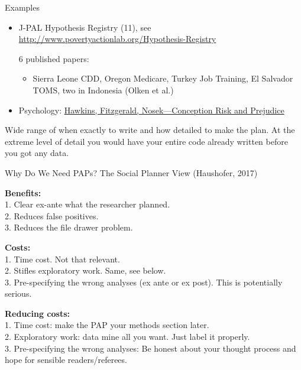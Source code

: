 \documentclass{beamer}
\begin{document}
\begin{frame}{Examples}

\begin{itemize}[<.->]
\item
J-PAL Hypothesis Registry (11), see \url{http://www.povertyactionlab.org/Hypothesis-Registry}

6 published papers:
\begin{itemize}
\item
 Sierra Leone CDD, Oregon Medicare, Turkey Job Training, El Salvador TOMS, two in Indonesia (Olken et al.)
\end{itemize}
\item Psychology: \href{http://pss.sagepub.com/content/26/2/249}{Hawkins, Fitzgerald, Nosek---Conception Risk and Prejudice}
\end{itemize} 
\vspace{0.25in}
Wide range of when exactly to write and how detailed to make the plan. At the extreme level of detail you would have your entire code already written before you got any data.
\end{frame}


\begin{frame}{Why Do We Need PAPs? The Social Planner View (Haushofer,
2017)}

\textbf{Benefits:}\\
1. Clear ex-ante what the researcher planned.\\
2. Reduces false positives.\\
3. Reduces the file drawer problem.

\pause

\textbf{Costs:}\\
1. Time cost. Not that relevant. \\
2. Stifles exploratory work. Same, see below.\\
3. Pre-specifying the wrong analyses (ex ante or ex post). This is
potentially serious.\\
\pause

\textbf{Reducing costs:}\\
1. Time cost: make the PAP your methods section later.\\
2. Exploratory work: data mine all you want. Just label it properly.\\
3. Pre-specifying the wrong analyses: Be honest about your thought
process and hope for sensible readers/referees.

\end{frame}
\end{document}
